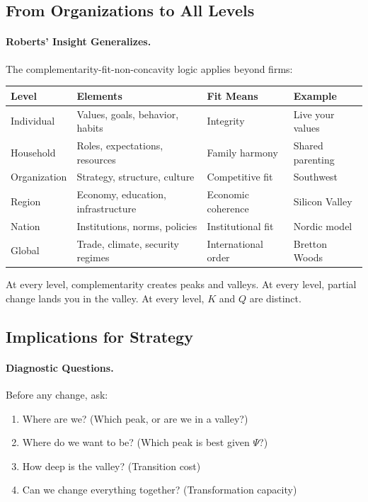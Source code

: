 \subsection{From Organizations to All Levels}

\paragraph{Roberts' Insight Generalizes.}
The complementarity-fit-non-concavity logic applies beyond firms:

\begin{center}
\renewcommand{\arraystretch}{1.3}
\begin{tabular}{llll}
\hline
\textbf{Level} & \textbf{Elements} & \textbf{Fit Means} & \textbf{Example} \\
\hline
Individual & Values, goals, behavior, habits & Integrity & Live your values \\
Household & Roles, expectations, resources & Family harmony & Shared parenting \\
Organization & Strategy, structure, culture & Competitive fit & Southwest \\
Region & Economy, education, infrastructure & Economic coherence & Silicon Valley \\
Nation & Institutions, norms, policies & Institutional fit & Nordic model \\
Global & Trade, climate, security regimes & International order & Bretton Woods \\
\hline
\end{tabular}
\end{center}

At every level, complementarity creates peaks and valleys.
At every level, partial change lands you in the valley.
At every level, $K$ and $Q$ are distinct.

\subsection{Implications for Strategy}

\paragraph{Diagnostic Questions.}
Before any change, ask:
\begin{enumerate}
  \item Where are we? (Which peak, or are we in a valley?)
  \item Where do we want to be? (Which peak is best given $\Psi$?)
  \item How deep is the valley? (Transition cost)
  \item Can we change everything together? (Transformation capacity)
\end{enumerate}

